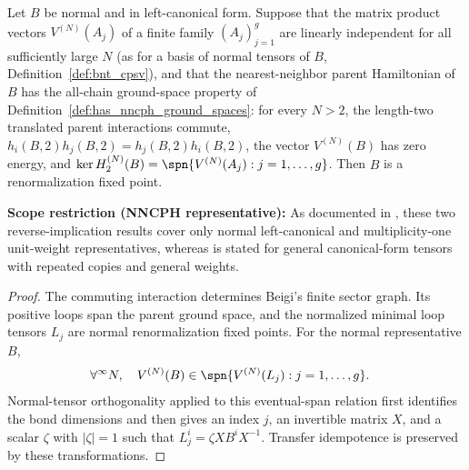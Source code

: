 \begin{lemma}
    \label{thm:nncph_implies_rfp}
    \leanok
    Let $B$ be normal and in left-canonical form. Suppose that the matrix
    product vectors $V^{(N)}(A_j)$ of a finite family $(A_j)_{j=1}^g$ are
    linearly independent for all sufficiently large $N$ (as for a basis of
    normal tensors of $B$, Definition~\ref{def:bnt_cpsv}), and that the
    nearest-neighbor parent Hamiltonian
    of $B$ has the all-chain ground-space property of
    Definition~\ref{def:has_nncph_ground_spaces}: for every $N>2$, the
    length-two translated parent interactions commute,
    $h_i(B,2)h_j(B,2)=h_j(B,2)h_i(B,2)$, the vector $V^{(N)}(B)$ has zero
    energy, and
    $\ker H_2^{(N)}(B) = \spn\{V^{(N)}(A_j):j=1,\ldots,g\}$.
    Then $B$ is a renormalization fixed point.

    \textbf{Scope restriction (NNCPH representative):}
    As documented in \cite{gap:cpsv16_nncph_ground_state_scope}, these two
    reverse-implication results cover only normal left-canonical and
    multiplicity-one unit-weight representatives, whereas
    \cite[Theorem~3.10]{Cirac2016MPDO_arXiv} is stated for general
    canonical-form tensors with repeated copies and general weights.
\end{lemma}

\begin{proof}
    \leanok
    The commuting interaction determines Beigi's finite sector graph. Its
    positive loops span the parent ground space, and the normalized minimal
    loop tensors $L_j$ are normal renormalization fixed points. For the normal
    representative $B$,
    \begin{align}
        \forall^\infty N,\quad
        V^{(N)}(B)
         & \in
        \spn\{V^{(N)}(L_j):j=1,\ldots,g\}. \notag
    \end{align}
    Normal-tensor orthogonality applied to this eventual-span relation first
    identifies the bond dimensions and then gives an index $j$, an invertible
    matrix $X$, and a scalar $\zeta$ with $|\zeta|=1$ such that
    $L_j^i = \zeta X B^i X^{-1}$.
    Transfer idempotence is preserved by these transformations.
\end{proof}

